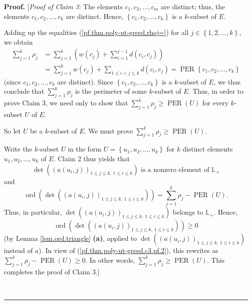 \documentclass[numbers=enddot,12pt,final,onecolumn,notitlepage]{scrartcl}%
\theoremstyle{definition}
\newenvironment{proof}[1][Proof]{\noindent\textbf{#1.} }{\ \rule{0.5em}{0.5em}}
\let\sumnonlimits\sum
\renewcommand{\sum}{\sumnonlimits\limits}
\renewcommand{\leq}{\leqslant}
\renewcommand{\geq}{\geqslant}
\theoremstyle{plainsl}
\begin{document}
\begin{proof}
[\textit{Proof of Claim 3:} The elements $c_{1},c_{2},\ldots,c_{m}$ are
distinct; thus, the elements $c_{1},c_{2},\ldots,c_{k}$ are distinct. Hence,
$\left\{  c_{1},c_{2},\ldots,c_{k}\right\}  $ is a $k$-subset of $E$.

Adding up the equalities (\ref{pf.thm.poly-ut-greed.rhoj=}) for all
$j\in\left\{  1,2,\ldots,k\right\}  $, we obtain%
\begin{align*}
\sum_{j=1}^{k}\rho_{j}  &  =\sum_{j=1}^{k}\left(  w\left(  c_{j}\right)
+\sum_{i=1}^{j-1}d\left(  c_{i},c_{j}\right)  \right) \\
&  =\sum_{j=1}^{k}w\left(  c_{j}\right)  +\sum_{1\leq i<j\leq k}d\left(
c_{i},c_{j}\right)  =\operatorname*{PER}\left\{  c_{1},c_{2},\ldots
,c_{k}\right\}
\end{align*}
(since $c_{1},c_{2},\ldots,c_{k}$ are distinct). Since $\left\{  c_{1}%
,c_{2},\ldots,c_{k}\right\}  $ is a $k$-subset of $E$, we thus conclude that
$\sum_{j=1}^{k}\rho_{j}$ is the perimeter of some $k$-subset of $E$. Thus, in
order to prove Claim 3, we need only to show that $\sum_{j=1}^{k}\rho_{j}%
\geq\operatorname*{PER}\left(  U\right)  $ for every $k$-subset $U$ of $E$.

So let $U$ be a $k$-subset of $E$. We must prove $\sum_{j=1}^{k}\rho_{j}%
\geq\operatorname*{PER}\left(  U\right)  $.

Write the $k$-subset $U$ in the form $U=\left\{  u_{1},u_{2},\ldots
,u_{k}\right\}  $ for $k$ distinct elements $u_{1},u_{2},\ldots,u_{k}$ of $E$.
Claim 2 thus yields that%
\[
\det\left(  \left(  a\left(  u_{i},j\right)  \right)  _{1\leq j\leq k,\ 1\leq
i\leq k}\right)  \text{ is a nonzero element of }\mathbb{L}_{+}%
\]
and%
\begin{equation}
\operatorname*{ord}\left(  \det\left(  \left(  a\left(  u_{i},j\right)
\right)  _{1\leq j\leq k,\ 1\leq i\leq k}\right)  \right)  =\sum_{j=1}^{k}%
\rho_{j}-\operatorname*{PER}\left(  U\right)  .
\label{pf.thm.poly-ut-greed.c3.pf.2}%
\end{equation}
Thus, in particular, $\det\left(  \left(  a\left(  u_{i},j\right)  \right)
_{1\leq j\leq k,\ 1\leq i\leq k}\right)  $ belongs to $\mathbb{L}_{+}$.
Hence,
\[
\operatorname*{ord}\left(  \det\left(  \left(  a\left(  u_{i},j\right)
\right)  _{1\leq j\leq k,\ 1\leq i\leq k}\right)  \right)  \geq0
\]
(by Lemma \ref{lem.ord.triangle} \textbf{(a)}, applied to $\det\left(  \left(
a\left(  u_{i},j\right)  \right)  _{1\leq j\leq k,\ 1\leq i\leq k}\right)  $
instead of $a$). In view of (\ref{pf.thm.poly-ut-greed.c3.pf.2}), this
rewrites as $\sum_{j=1}^{k}\rho_{j}-\operatorname*{PER}\left(  U\right)
\geq0$. In other words, $\sum_{j=1}^{k}\rho_{j}\geq\operatorname*{PER}\left(
U\right)  $. This completes the proof of Claim 3.] \medskip


\end{proof}
\end{document}
